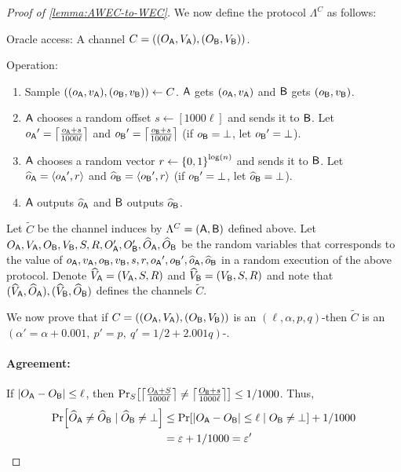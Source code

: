 \begin{proof}[Proof of \cref{lemma:AWEC-to-WEC}]
We now define the protocol $\Lambda^C$ as follows:
\begin{protocol}[$\Lambda^C=(\Ac,\Bc)$]
\item Oracle access: A channel $C =((O_{\mathsf{A}},{V_{\mathsf{A}}}),(O_{\mathsf{B}},{V_{\mathsf{B}}}))$.
	\item Operation:
	\begin{enumerate}
            \item Sample $(({o_{\mathsf{A}}},{v_{\mathsf{A}}}),({o_{\mathsf{B}}},{v_{\mathsf{B}}}))\leftarrow C$. $\mathsf{A}$ gets $({o_{\mathsf{A}}},{v_{\mathsf{A}}})$ and $\mathsf{B}$ gets $({o_{\mathsf{B}}},{v_{\mathsf{B}}})$. 
		
			\item $\mathsf{A}$ chooses a random offset $s\gets [1000\ell]$ and sends it to $\mathsf{B}$. Let $\oA'=\ceil{\frac{\oA+s}{1000\ell}}$ and $\oB'=\ceil{\frac{\oB+s}{1000\ell}}$ (if ${o_{\mathsf{B}}}=\bot$, let ${o_{\mathsf{B}}}'=\bot$). 
        \item $\mathsf{A}$ chooses a random vector $r\from \zo^{\log(n)}$ and sends it to $\mathsf{B}$. Let ${\widehat{o}_{\mathsf{A}}}=\langle {o_\ensuremath{\mathsf{A}}}',r \rangle$ and ${\widehat{o}_{\mathsf{B}}}=\langle {o_\ensuremath{\mathsf{B}}}',r \rangle$ (if ${o_{\mathsf{B}}}'=\bot$, let ${\widehat{o}_{\mathsf{B}}}=\bot$).
        \item $\mathsf{A}$ outputs ${\widehat{o}_{\mathsf{A}}}$ and $\mathsf{B}$ outputs ${\widehat{o}_{\mathsf{B}}}$.
        \end{enumerate}
\end{protocol}
Let $\tilde{C}$ be the channel induces by $\Lambda^C=(\Ac,\Bc)$ defined above. 
Let $O_{\mathsf{A}},{V_{\mathsf{A}}},O_{\mathsf{B}},{V_{\mathsf{B}}},S,R,O_{\mathsf{A}}',O_{\mathsf{B}}',{\widehat{O}_{\mathsf{A}}},{\widehat{O}_{\mathsf{B}}}$ be the random variables that corresponds to the value of ${o_{\mathsf{A}}},{v_{\mathsf{A}}},{o_{\mathsf{B}}},{v_{\mathsf{B}}},s,r,{o_{\mathsf{A}}}',{o_{\mathsf{B}}}',{\widehat{o}_{\mathsf{A}}},{\widehat{o}_{\mathsf{B}}}$ in a random execution of the above protocol. Denote ${\widehat{V}_{\mathsf{A}}}=({V_{\mathsf{A}}},S,R)$ and ${\widehat{V}_{\mathsf{B}}}=({V_{\mathsf{B}}},S,R)$ and note that $({\widehat{V}_{\mathsf{A}}},{\widehat{O}_{\mathsf{A}}}),({\widehat{V}_{\mathsf{B}}},{\widehat{O}_{\mathsf{B}}})$ defines the channels $\tilde{C}$.



We now prove that if $C=((O_{\mathsf{A}},{V_{\mathsf{A}}}),(O_{\mathsf{B}},{V_{\mathsf{B}}}))$ is an $(\ell,\alpha,p,q)$-\AWEC then $\tilde{C}$ is an $(\alpha'=\alpha+0.001,\: p' = p ,\:  q' = 1/2 + 2.001q)$-\WEC.

\paragraph{Agreement:} If $\size{\OA-\OB}\le \ell$, then $\ppr{S}{\ceil{\frac{\OA+S}{1000\ell}}\ne \ceil{\frac{\OB+s}{1000\ell}}}\le 1/1000$. Thus, 
\begin{align*}
    \pr{\hOA\ne \hOB\mid \hOB\ne \bot} &\leq\pr{|\OA - \OB|\leq \ell\mid \OB\ne \bot}+1/1000\\
    &= \eps+1/1000=\eps'
\end{align*}


\end{proof}
